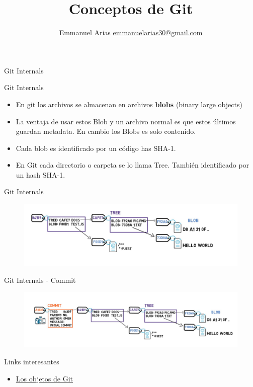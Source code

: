 \documentclass{beamer}
\title{Conceptos de Git}
\author{Emmanuel Arias \href{mailto:emmanuelarias30@gmail.com}{emmanuelarias30@gmail.com}}
\date{}
\begin{document}
\begin{frame}[plain]
    \maketitle
\end{frame}

\begin{frame}
   \Huge Git Internals
\end{frame}

\begin{frame}{Git Internals}
	\begin{itemize}
		\item En git los archivos se almacenan en archivos \textbf{blobs} (binary large objects)
		\item La ventaja de usar estos Blob y un archivo normal es que estos últimos guardan metadata. En cambio los Blobs es solo contenido.
		\item Cada blob es identificado por un código has SHA-1. 
		\item En Git cada directorio o carpeta se lo llama Tree. También identificado por un hash SHA-1.
	\end{itemize}
\end{frame}

\begin{frame}{Git Internals}
	\begin{figure}
		\centering
		\includegraphics[width=1\linewidth]{img/tree-blobs}
		\label{fig:tree-blobs}
	\end{figure}
\end{frame}

\begin{frame}{Git Internals - Commit}
\begin{figure}
	\centering
	\includegraphics[width=1\linewidth]{img/tree-blobs1}
	\label{fig:tree-blobs1}
\end{figure}
\end{frame}

\begin{frame}[plain]{Links interesantes}
	\begin{itemize}
		\item \href{https://git-scm.com/book/es/v2/Los-entresijos-internos-de-Git-Los-objetos-Git}{Los objetos de Git}
	\end{itemize}
\end{frame}
\end{document}
